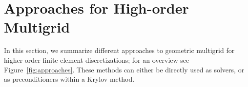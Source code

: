 \documentclass[smallcondensed,final]{svjour3}     %
\begin{document}







\section{Approaches for High-order Multigrid}
\label{sec:approaches}

In this section, we summarize different approaches to geometric
multigrid for higher-order finite element discretizations; for an
overview see Figure~\ref{fig:approaches}. These methods can either be
directly used as solvers, or as preconditioners within a Krylov method.
\end{document}
